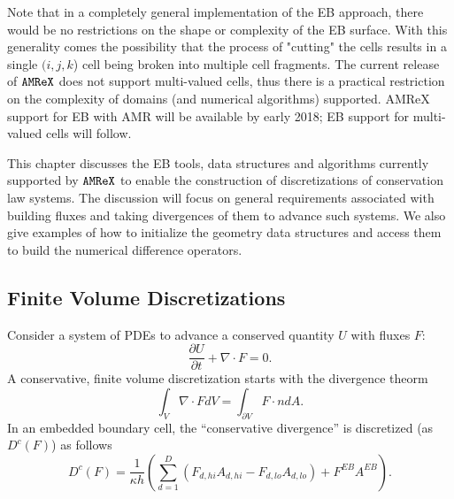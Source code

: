 Note that in a completely general implementation of the EB approach, 
there would be no restrictions on the shape or complexity of the EB surface.  
With this generality comes the possibility that the process of "cutting" the cells
results in a single $(i,j,k$) cell being broken into multiple cell fragments.
The current release of $\tt{AMReX}$ does not support multi-valued cells, thus there is a
practical restriction on the complexity of domains (and numerical algorithms) supported.  
AMReX support for EB with AMR will be available by early 2018;
EB support for multi-valued cells will follow.

This chapter discusses the EB tools, data structures and algorithms currently supported by
$\tt{AMReX}$ to enable the construction of discretizations of conservation law systems.
The discussion will focus on general requirements associated with building fluxes and
taking divergences of them to advance such systems.  We also give examples of how to
initialize the geometry data structures and access them to build the numerical difference
operators.

\subsection{Finite Volume Discretizations}
Consider a system of PDEs to advance a conserved quantity $U$
with fluxes $F$:
\begin{equation}
\frac{\partial U}{\partial t} + \nabla \cdot F = 0.
\label{eqn::hypsys}
\end{equation}
A conservative, finite volume discretization starts with
the divergence theorm
$$
\int_V \nabla \cdot F dV = \int_{\partial V} F \cdot n dA.
$$
In an embedded boundary cell, the ``conservative divergence'' is discretized  (as
$D^c(F)$) as follows
\begin{equation}
D^c(F) = \frac{1}{\kappa h} \left( \sum^D_{d = 1}
  (F_{d, hi}A_{d,hi} - F_{d, lo}A_{d,lo})  + F^{EB} A^{EB} \right).
\label{eqn::ebdiv}
\end{equation}

